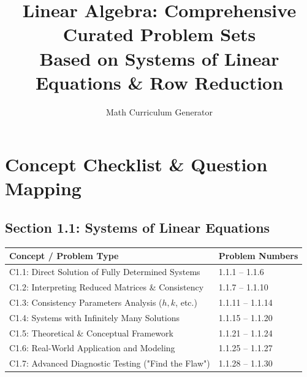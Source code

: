 \documentclass[11pt]{article}
\title{Linear Algebra: Comprehensive Curated Problem Sets \\ \large Based on Systems of Linear Equations \& Row Reduction}
\author{Math Curriculum Generator}
\date{}
\begin{document}
\maketitle
\tableofcontents
\newpage

\section{Concept Checklist \& Question Mapping}

\subsection*{Section 1.1: Systems of Linear Equations}
\begin{table}[h]
\centering
\begin{tabular}{@{}ll@{}}
\toprule
\textbf{Concept / Problem Type} & \textbf{Problem Numbers} \\ \midrule
C1.1: Direct Solution of Fully Determined Systems & 1.1.1 -- 1.1.6 \\
C1.2: Interpreting Reduced Matrices \& Consistency & 1.1.7 -- 1.1.10 \\
C1.3: Consistency Parameters Analysis ($h, k$, etc.) & 1.1.11 -- 1.1.14 \\
C1.4: Systems with Infinitely Many Solutions & 1.1.15 -- 1.1.20 \\
C1.5: Theoretical \& Conceptual Framework & 1.1.21 -- 1.1.24 \\
C1.6: Real-World Application and Modeling & 1.1.25 -- 1.1.27 \\
C1.7: Advanced Diagnostic Testing ("Find the Flaw") & 1.1.28 -- 1.1.30 \\ \bottomrule
\end{tabular}
\end{table}
\end{document}
